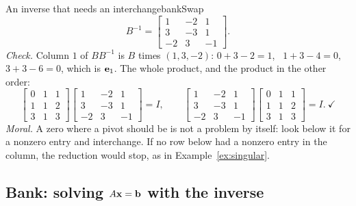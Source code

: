 \documentclass[11pt]{article}
\begin{document}
\begin{exmp}{An inverse that needs an interchange}{bankSwap}
\[
B^{-1}=\begin{bmatrix}1&-2&1\\3&-3&1\\-2&3&-1\end{bmatrix}.
\]
\emph{Check.} Column $1$ of $BB^{-1}$ is $B$ times $(1,3,-2)$: $0+3-2=1$, \ $1+3-4=0$, \ $3+3-6=0$, which is $\mathbf{e}_1$. The whole product, and the product in the other order:
\[
\begin{bmatrix}0&1&1\\1&1&2\\3&1&3\end{bmatrix}\begin{bmatrix}1&-2&1\\3&-3&1\\-2&3&-1\end{bmatrix}=I,\qquad
\begin{bmatrix}1&-2&1\\3&-3&1\\-2&3&-1\end{bmatrix}\begin{bmatrix}0&1&1\\1&1&2\\3&1&3\end{bmatrix}=I.\ \checkmark
\]
\emph{Moral.} A zero where a pivot should be is not a problem by itself: look below it for a nonzero entry and interchange. If no row below had a nonzero entry in the column, the reduction would stop, as in Example~\ref{ex:singular}.
\end{exmp}

\subsection*{Bank: solving $A\mathbf{x}=\mathbf{b}$ with the inverse}
\end{document}
